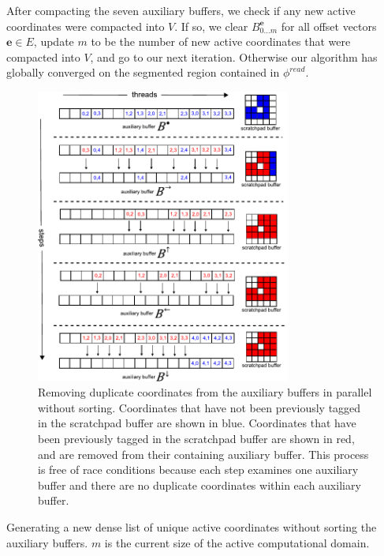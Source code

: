 \documentclass[annualconference]{acmsiggraph}  %
\newcommand{\leftbracket}{\left(}
\newcommand{\rightbracket}{\right)}
\newcommand{\leftcbracket}{\left\{}
\newcommand{\rightcbracket}{\right\}}
\newcommand{\phiread}{ \phi^{read} }
\begin{document}
{After compacting the seven auxiliary buffers, we check if any new active coordinates were compacted into $V$. If so, we clear $B^{\mathbf{e}}_{0 \ldots m}$ for all offset vectors $\mathbf{e} \in E$, update $m$ to be the number of new active coordinates that were compacted into $V$, and go to our next iteration. Otherwise our algorithm has globally converged on the segmented region contained in $\phiread$.

\begin{figure}[t]
\centering
\includegraphics[width=3.3in]{figures/RemoveDuplicates-Alt.pdf}
\caption{Removing duplicate coordinates from the auxiliary buffers in parallel without sorting. Coordinates that have not been previously tagged in the scratchpad buffer are shown in blue. Coordinates that have been previously tagged in the scratchpad buffer are shown in red, and are removed from their containing auxiliary buffer. This process is free of race conditions because each step examines one auxiliary buffer and there are no duplicate coordinates within each auxiliary buffer.}
\label{fig:remove}
\end{figure}
\begin{Listing}[t]
    \caption{Generating a new dense list of unique active coordinates without sorting the auxiliary buffers. $m$ is the current size of the active computational domain. \label{pseudo:5} }
    \begin{algorithmic}[1]
        \STATE { $ E' \gets E - \leftcbracket \leftbracket 0,0,0 \rightbracket , \leftbracket 0,0,1 \rightbracket \rightcbracket $ }
            \STATE { $\mathbf{b} \gets B^{ \leftbracket 0,0,0 \rightbracket }_{h}$ }       

\end{algorithmic}
\end{Listing}}
\end{document}
